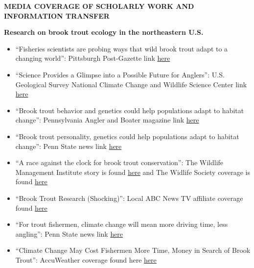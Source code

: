 \documentclass[10pt]{article}
\begin{document}
\begin{flushleft}
\vspace{5pt}
\vspace{6pt}
\centerline {\bf{MEDIA COVERAGE OF SCHOLARLY WORK AND INFORMATION TRANSFER}}
\vspace{5pt}


\textbf{Research on brook trout ecology in the northeastern U.S.}\\
\begin{itemize}
\item ``Fisheries scientists are probing ways that wild brook trout adapt to a changing world'': Pittsburgh Post-Gazette link \href{http://www.post-gazette.com/sports/outdoors/2017/12/31/Fishery-scientists-are-probing-ways-that-wild-brook-trout-adapt-to-a-changing-world/stories/201712310280}{here}\\
\item ``Science Provides a Glimpse into a Possible Future for Anglers'': U.S. Geological Survey National Climate Change and Wildlife Science Center link
\href{https://nccwsc.usgs.gov/content/science-provides-glimpse-possible-future-anglers}{here}\\
\item ``Brook trout behavior and genetics could help populations adapt to habitat change'': Pennsylvania Angler and Boater magazine link
\href{http://www.fishandboat.com/Transact/AnglerBoater/AnglerBoater2017/MayJune/Documents/2017-0506mj-10brook.pdf}{here}\\
\item ``Brook trout personality, genetics could help populations adapt to habitat change'': Penn State news link 
\href{http://news.psu.edu/story/442050/2016/12/13/brook-trout-personality-genetics-could-help-populations-adapt-habitat-change}{here}\\
\item ``A race against the clock for brook trout conservation'': The Wildlife Management Institute story is found \href{https://wildlifemanagement.institute/outdoor-news-bulletin/september-2016/race-against-clock-brook-trout-conservation}{here} and The Widlife Society coverage is found
\href{http://wildlife.org/a-race-against-the-clock-for-brook-trout-conservation/}{here}\\
\item ``Brook Trout Research (Shocking)'': Local ABC News TV affiliate coverage found \href{http://wnep.com/2016/09/25/brook-trout-research-shocking/}{here}\\
\item ``For trout fishermen, climate change will mean more driving time, less angling'': Penn State news link
\href{http://news.psu.edu/story/366131/2015/08/20/research/trout-fishermen-climate-change-will-mean-more-driving-time-less}{here}
\item ``Climate Change May Cost Fishermen More Time, Money in Search of Brook Trout'': AccuWeather coverage found here \href{http://www.accuweather.com/en/weather-news/climate-change-brook-trout-fisherman-high-cost/52151933}{here}\\


\end{itemize}
\end{flushleft}
\end{document}

